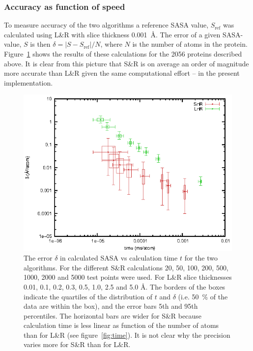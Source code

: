 \documentclass[a4paper,11pt]{article}
\begin{document}
\subsubsection{Accuracy as function of speed}\label{sec:accuracy}

To measure accuracy of the two algorithms a reference SASA value,
$S_\text{ref}$ was calculated using L\&R with slice thickness
0.001~Å. The error of a given SASA-value, $S$ is then $\delta = \lvert
S - S_\text{ref} \rvert / N$, where $N$ is the number of atoms in the
protein. Figure~\ref{fig:precision} shows the results of these
calculations for the 2056 proteins described above.  It is clear from
this picture that S\&R is on average an order of magnitude more
accurate than L\&R given the same computational effort -- in the
present implementation.

\begin{figure}
  \begin{center}
  \includegraphics{../analysis/plots/precision}
  \caption{The error $\delta$ in calculated SASA vs calculation time
    $t$ for the two algorithms. For the different S\&R calculations
    20, 50, 100, 200, 500, 1000, 2000 and 5000 test points were
    used. For L\&R slice thicknesses 0.01, 0.1, 0.2, 0.3, 0.5, 1.0,
    2.5 and 5.0 Å. The borders of the boxes indicate the quartiles of
    the distribution of $t$ and $\delta$ (i.e. 50~\% of the data are
    within the box), and the error bars 5th and 95th percentiles.  The
    horizontal bars are wider for S\&R because calculation time is
    less linear as function of the number of atoms than for L\&R (see
    figure~\ref{fig:time}). It is not clear why the precision varies
    more for S\&R than for L\&R.
    \label{fig:precision}}
  \end{center}
\end{figure}
\end{document}
